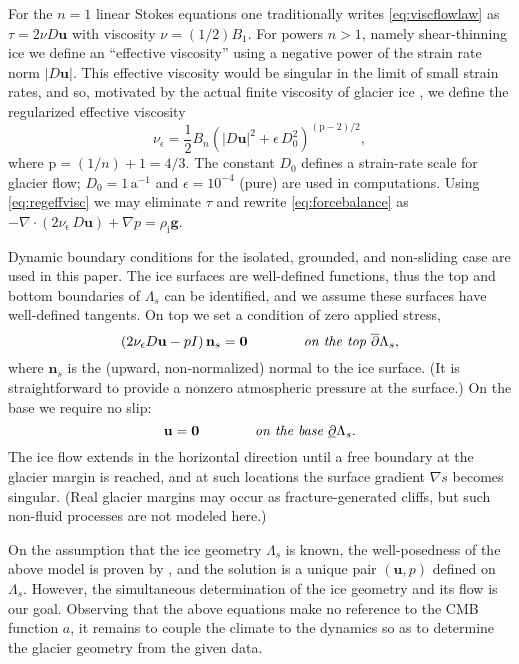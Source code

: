 \documentclass[letterpaper,final,12pt,reqno]{amsart}
\theoremstyle{claim}
\newcommand{\eps}{\epsilon}
\newcommand{\grad}{\nabla}
\newcommand{\bn}{\mathbf{n}}
\newcommand{\bu}{\mathbf{u}}
\newcommand{\bzero}{\bm{0}}
\newcommand{\rhoi}{\rho_{\text{i}}}
\newcommand{\pp}{{\text{p}}}
\numberwithin{equation}{section}
\numberwithin{figure}{section}
\numberwithin{table}{section}
\numberwithin{theorem}{section}
\begin{document}
For the $n=1$ linear Stokes equations \cite{Elmanetal2014} one traditionally writes \eqref{eq:viscflowlaw} as $\tau = 2\nu D\bu$ with viscosity $\nu = (1/2) B_1$.  For powers $n>1$, namely shear-thinning ice we define an ``effective viscosity'' using a negative power of the strain rate norm $|D\bu|$.  This effective viscosity would be singular in the limit of small strain rates, and so, motivated by the actual finite viscosity of glacier ice \cite{GreveBlatter2009}, we define the regularized effective viscosity
\begin{equation}
\nu_\eps = \frac{1}{2} B_n \left(|D\bu|^2 + \eps\, D_0^2\right)^{(\pp-2)/2}, \label{eq:regeffvisc}
\end{equation}
where $\pp=(1/n)+1=4/3$.  The constant $D_0$ defines a strain-rate scale for glacier flow; $D_0 = 1 \,\text{a}^{-1}$ and $\eps = 10^{-4}$ (pure) are used in computations.  Using \eqref{eq:regeffvisc} we may eliminate $\tau$ and rewrite \eqref{eq:forcebalance} as $- \nabla \cdot \left(2 \nu_\eps\, D\bu\right) + \nabla p = \rhoi \mathbf{g}$.

Dynamic boundary conditions for the isolated, grounded, and non-sliding case are used in this paper.  The ice surfaces are well-defined functions, thus the top and bottom boundaries of $\Lambda_s$ can be identified, and we assume these surfaces have well-defined tangents.  On top we set a condition of zero applied stress,
\begin{equation}
\left(2 \nu_\eps D\bu - pI\right) \bn_s = \bzero  \qquad \qquad \text{\emph{on the top} } \overline{\partial} \Lambda_s, \label{eq:topbc}
\end{equation}
where $\bn_s$ is the (upward, non-normalized) normal to the ice surface.  (It is straightforward to provide a nonzero atmospheric pressure at the surface.)  On the base we require no slip:
\begin{equation}
\bu = \bzero  \qquad\qquad \text{\emph{on the base} } \underline{\partial} \Lambda_s. \label{eq:basebc}
\end{equation}
The ice flow extends in the horizontal direction until a free boundary at the glacier margin is reached, and at such locations the surface gradient $\grad s$ becomes singular.  (Real glacier margins may occur as fracture-generated cliffs, but such non-fluid processes are not modeled here.)

On the assumption that the ice geometry $\Lambda_s$ is known, the well-posedness of the above model is proven by \cite{JouvetRappaz2011}, and the solution is a unique pair $(\bu,p)$ defined on $\Lambda_s$.  However, the simultaneous determination of the ice geometry and its flow is our goal.  Observing that the above equations make no reference to the CMB function $a$, it remains to couple the climate to the dynamics so as to determine the glacier geometry from the given data.
\end{document}
